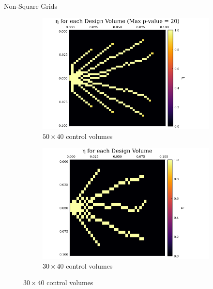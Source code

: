 \documentclass[final]{beamer}
\begin{document}
\begin{frame}{Non-Square Grids}
	\begin{figure}
		\begin{subfigure}{0.45\textwidth}
			\centering
			\includegraphics[width=1.1\linewidth]{50x40-Final_Design.png}
			\caption[Rectangular Control Volume Design]{$50\times 40$ control volumes}\label{fig:SIMP-Output-50-40}
		\end{subfigure}
		\begin{subfigure}{0.45\textwidth}
			\centering
			\includegraphics[width=1.1\textwidth]{SIMP-Example-Checkerboarding.png}
			\caption[Checkerboard Result in Practice]{$30\times 40$ control volumes}
			\label{fig:SIMP-Checkerboard}
		\end{subfigure}
	\end{figure}
\end{frame}
\end{document}
